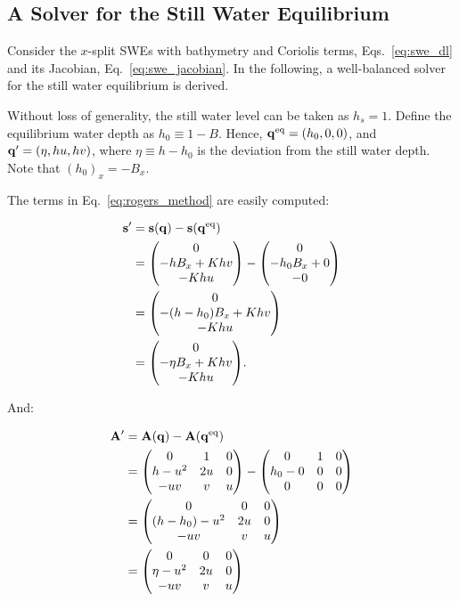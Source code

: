 \subsection{A Solver for the Still Water Equilibrium}
\label{sec:rogers_still}

Consider the $x$-split SWEs with bathymetry and Coriolis terms, Eqs.~\ref{eq:swe_dl} and its Jacobian, Eq.~\ref{eq:swe_jacobian}. In the following, a well-balanced solver for the still water equilibrium is derived.

Without loss of generality, the still water level can be taken as $h_s = 1$. Define the equilibrium water depth as $h_0 \equiv 1 - B$. Hence, $\vb q^\mathrm{eq} = (h_0, 0, 0)$, and $\vb q' = (\eta, hu, hv)$, where $\eta \equiv h - h_0$ is the deviation from the still water depth. Note that $(h_0)_x = - B_x$.

The terms in Eq.~\ref{eq:rogers_method} are easily computed:

\begin{align}
  \vb s' &= \vb s(\vb q) - \vb s(\eq{\vb q}) \\
  &= \mqty(0 \\ -h B_x + K h v \\ - K h u) - \mqty(0 \\ -h_0 B_x + 0 \\ - 0) \\
  &= \mqty(0 \\ -(h-h_0) B_x + K h v \\ - K h u) \\
  &= \mqty(0 \\ -\eta B_x + K h v \\ - K h u).
\end{align}

And:

\begin{align}
  \vb A' &= \vb A(\vb q) - \vb A(\eq{\vb q}) \\
  &= \mqty(
    0 & 1 & 0 \\
    h - u^2 & 2u & 0 \\
    -uv & v & u
  ) - \mqty(
    0 & 1 & 0 \\
    h_0 - 0 & 0 & 0 \\
    0 & 0 & 0
  ) \\
  &= \mqty(
    0 & 0 & 0 \\
    (h - h_0) - u^2 & 2u & 0 \\
    -uv & v & u
  ) \\
  &= \mqty(
    0 & 0 & 0 \\
    \eta - u^2 & 2u & 0 \\
    -uv & v & u
  )
\end{align}

